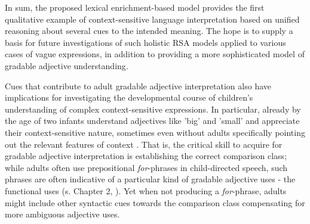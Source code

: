 In sum, the proposed lexical enrichment-based model provides the first qualitative example of context-sensitive language interpretation based on unified reasoning about several cues to the intended meaning. The hope is to supply a basis for future investigations of such holistic RSA models applied to various cases of vague expressions, in addition to providing a more sophisticated model of gradable adjective understanding.

Cues that contribute to adult gradable adjective interpretation also have implications for investigating the developmental course of children's understanding of complex context-sensitive expressions. In particular, already by the age of two infants understand adjectives like 'big' and 'small' and appreciate their context-sensitive nature, sometimes even without adults specifically pointing out the relevant features of context \parencite{Mintz2002, ebeling1994children}. That is, the critical skill to acquire for gradable adjective interpretation is establishing the correct comparison class; while adults often use prepositional \emph{for}-phrases in child-directed speech, such phrases are often indicative of a particular kind of gradable adjective uses - the functional uses (s. Chapter 2, \textcite{ebeling1994children}). Yet when not producing a \emph{for}-phrase, adults might include other syntactic cues towards the comparison class compensating for more ambiguous adjective uses. 

